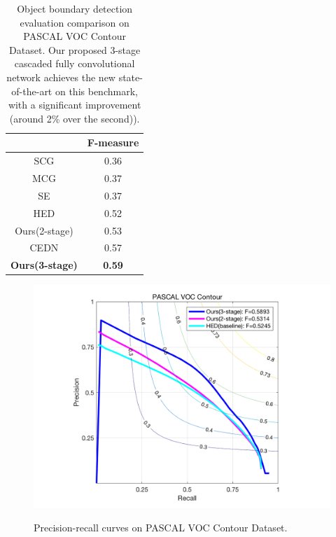 \documentclass[senior]{IPSstyle}
\begin{document}
\begin{table}[t]
\renewcommand{\arraystretch}{0.8}
\caption{Object boundary detection evaluation comparison on PASCAL VOC Contour Dataset\cite{Yang2016}. Our proposed 3-stage cascaded fully convolutional network achieves the new state-of-the-art on this benchmark, with a significant improvement (around 2\% over the second)).}
\label{outcome}
\begin{center}
\begin{tabular}{|c|c|}
\hline
&\multicolumn{1}{c|}{F-measure}\\
\hline
SCG\cite{Arbelaez2014} 			& 0.36	\\	\hline
MCG\cite{Arbelaez2014} 			& 0.37 	\\	\hline
SE\cite{Dollar2013}			& 0.37	 \\	\hline
HED\cite{Xie2015} 			& 0.52	\\	\hline
Ours(2-stage) 			& 0.53	\\	\hline
CEDN\cite{Yang2016}		& 0.57	\\	\hline
\textbf{Ours(3-stage)} 	& \textbf{0.59}	\\	\hline
\end{tabular}
\end{center}
\label{voc fscore}
\end{table}

\begin{figure}[t]
  \centering
  \includegraphics[width=15cm]{voc_prcurve.png}\\
  \caption{Precision-recall curves on PASCAL VOC Contour Dataset\cite{Yang2016}.}\label{voc prcurve}
\end{figure}
\end{document}
